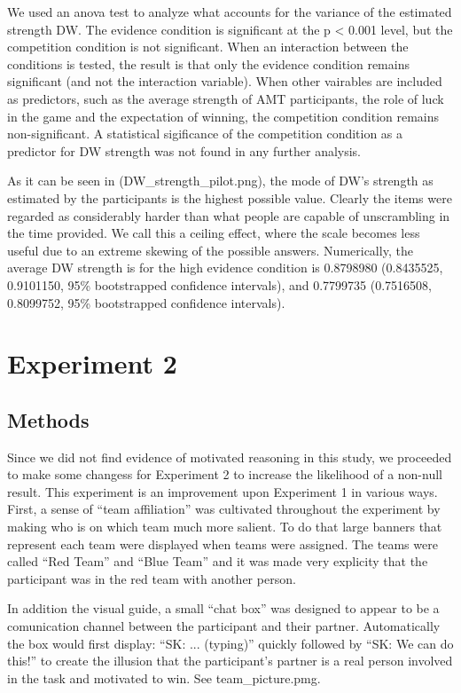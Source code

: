 \documentclass{article}
\begin{document}
We used an anova test to analyze what accounts for the variance of the estimated strength DW. The evidence condition is significant at the p < 0.001 level, but the competition condition is not significant. When an interaction between the conditions is tested, the result is that only the evidence condition remains significant (and not the interaction variable). When other vairables are included as predictors, such as the average strength of AMT participants, the role of luck in the game and the expectation of winning, the competition condition remains non-significant. A statistical sigificance of the competition condition as a predictor for DW strength was not found in any further analysis.

As it can be seen in (DW\_strength\_pilot.png), the mode of DW's strength as estimated by the participants is the highest possible value. Clearly the items were regarded as considerably harder than what people are capable of unscrambling in the time provided. We call this a ceiling effect, where the scale becomes less useful due to an extreme skewing of the possible answers. Numerically, the average DW strength is for the high evidence condition is 0.8798980 (0.8435525, 0.9101150, 95\% bootstrapped confidence intervals), and 0.7799735 (0.7516508, 0.8099752, 95\% bootstrapped confidence intervals).

\section{Experiment 2}

\subsection{Methods}


Since we did not find evidence of motivated reasoning in this study, we proceeded to make some changess for Experiment 2 to increase the likelihood of a non-null result. This experiment is an improvement upon Experiment 1 in various ways. First, a sense of ``team affiliation'' was cultivated throughout the experiment by making who is on which team much more salient. To do that large banners that represent each team were displayed when teams were assigned. The teams were called ``Red Team'' and ``Blue Team'' and it was made very explicity that the participant was in the red team with another person. 

In addition the visual guide, a small ``chat box'' was designed to appear to be a comunication channel between the participant and their partner. Automatically the box would first display: ``SK: ... (typing)'' quickly followed by ``SK: We can do this!'' to create the illusion that the participant's partner is a real person involved in the task and motivated to win. See team\_picture.pmg.
\end{document}

